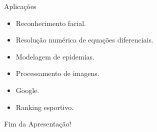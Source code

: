 \documentclass[article]{beamer}%
\begin{document}
\begin{frame}{Aplicações}
    \begin{itemize}[<+->]
        \item Reconhecimento facial.

        \item Resolução numérica de equações diferenciais.

        \item Modelagem de epidemias.

        \item Processamento de imagens.

        \item Google.

        \item Ranking esportivo.
    \end{itemize}
\end{frame}

\begin{frame}{Fim da Apresentação!}

\end{frame}
\end{document}
